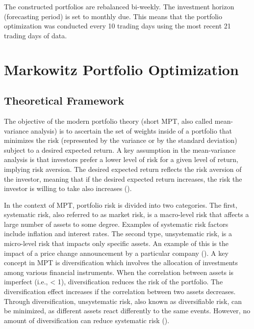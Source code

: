 \documentclass[a4paper,12pt]{article}
\begin{document}
The constructed portfolios are rebalanced bi-weekly. The investment horizon (forecasting period) is set to monthly due. This means that the portfolio optimization was conducted every 10 trading days using the most recent 21 trading days of data.

\newpage

\section{Markowitz Portfolio Optimization}

\subsection{Theoretical Framework \label{theory}}

The objective of the modern portfolio theory (short MPT, also called mean-variance analysis) is to ascertain the set of weights inside of a portfolio that minimizes the risk (represented by the variance or by the standard deviation) subject to a desired expected return. A key assumption in the mean-variance analysis is that investors prefer a lower level of risk for a given level of return, implying risk aversion. The desired expected return reflects the risk aversion of the investor, meaning that if the desired expected return increases, the risk the investor is willing to take also increases (\cite{lindquist2022advanced}).

In the context of MPT, portfolio risk is divided into two categories. The first, systematic risk, also referred to as market risk, is a macro-level risk that affects a large number of assets to some degree. Examples of systematic risk factors include inflation and interest rates. The second type, unsystematic risk, is a micro-level risk that impacts only specific assets. An example of this is the impact of a price change announcement by a particular company (\cite{ross2002capital}). A key concept in MPT is diversification which involves the allocation of investments among various financial instruments. When the correlation between assets is imperfect (i.e., < 1), diversification reduces the risk of the portfolio. The diversification effect increases if the correlation between two assets decreases. Through diversification, unsystematic risk, also known as diversifiable risk, can be minimized, as different assets react differently to the same events. However,  no amount of diversification can reduce systematic risk (\cite{mangram2013simplified}). 
\end{document}
